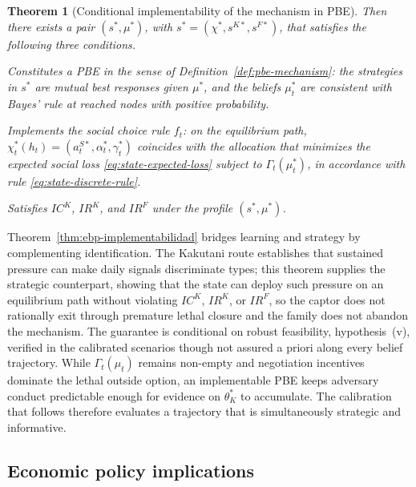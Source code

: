 \documentclass[pdflatex,sn-mathphys-ay]{sn-jnl}
\theoremstyle{plain}
\newtheorem{theorem}{Theorem}
\theoremstyle{definition}
\newcommand{\1}{\mathbf{1}}
\begin{document}
\begin{theorem}[Conditional implementability of the mechanism in PBE]
Then there exists a pair $(s^\ast,\mu^\ast)$, with $s^\ast=({\chi}^\ast,s^{K\ast},s^{F\ast})$, that satisfies the following three conditions.
\begin{list}{}{\setlength{\labelwidth}{2.0em}\setlength{\labelsep}{0.7em}\setlength{\leftmargin}{2.7em}\setlength{\itemindent}{0pt}\setlength{\listparindent}{0pt}\setlength{\parsep}{0pt}\setlength{\itemsep}{0.25\baselineskip}}
    \item[\textup{(a)}] Constitutes a PBE in the sense of Definition~\ref{def:pbe-mechanism}: the strategies in $s^\ast$ are mutual best responses given $\mu^\ast$, and the beliefs $\mu_t^\ast$ are consistent with Bayes' rule at reached nodes with positive probability.
    \item[\textup{(b)}] Implements the social choice rule $f_t$: on the equilibrium path, $\chi_t^\ast(h_t)=(a_t^{S\ast},\alpha_t^\ast,\gamma_t^\ast)$ coincides with the allocation that minimizes the expected social loss \eqref{eq:state-expected-loss} subject to $\Gamma_t(\mu_t^\ast)$, in accordance with rule \eqref{eq:state-discrete-rule}.
    \item[\textup{(c)}] Satisfies $IC^K$, $IR^K$, and $IR^F$ under the profile $(s^\ast,\mu^\ast)$.
\end{list}
\end{theorem}

\noindent Theorem~\ref{thm:ebp-implementabilidad} bridges learning and strategy by complementing identification. The Kakutani route establishes that sustained pressure can make daily signals discriminate types; this theorem supplies the strategic counterpart, showing that the state can deploy such pressure on an equilibrium path without violating $IC^K$, $IR^K$, or $IR^F$, so the captor does not rationally exit through premature lethal closure and the family does not abandon the mechanism. The guarantee is conditional on robust feasibility, hypothesis~(v), verified in the calibrated scenarios though not assured a priori along every belief trajectory. While $\Gamma_t(\mu_t)$ remains non-empty and negotiation incentives dominate the lethal outside option, an implementable PBE keeps adversary conduct predictable enough for evidence on $\theta_K^\ast$ to accumulate. The calibration that follows therefore evaluates a trajectory that is simultaneously strategic and informative.

\subsection{Economic policy implications}\label{subsec:implicaciones-politica}
\end{document}
